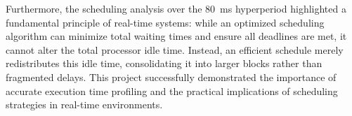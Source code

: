 \documentclass{report}
\begin{document}
Furthermore, the scheduling analysis over the 80~ms hyperperiod highlighted a fundamental principle of real-time systems: while an optimized scheduling algorithm can minimize total waiting times and ensure all deadlines are met, it cannot alter the total processor idle time. Instead, an efficient schedule merely redistributes this idle time, consolidating it into larger blocks rather than fragmented delays. This project successfully demonstrated the importance of accurate execution time profiling and the practical implications of scheduling strategies in real-time environments.
\end{document}
